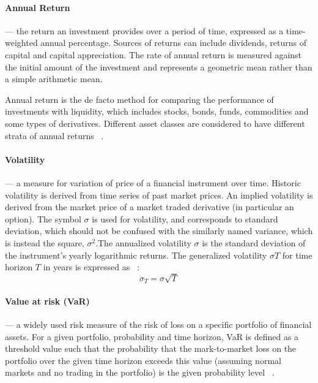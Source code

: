 \paragraph*{Annual Return} --- the return an investment provides over a period of time, expressed as a time-weighted annual percentage. Sources of returns can include dividends, returns of capital and capital appreciation. The rate of annual return is measured against the initial amount of the investment and represents a geometric mean rather than a simple arithmetic mean. 

    Annual return is the de facto method for comparing the performance of investments with liquidity, which includes stocks, bonds, funds, commodities and some types of derivatives. Different asset classes are considered to have different strata of annual returns ~\cite{Sel6}.

\paragraph*{Volatility} --- a measure for variation of price of a financial instrument over time. Historic volatility is derived from time series of past market prices. An implied volatility is derived from the market price of a market traded derivative (in particular an option). The symbol $\sigma$ is used for volatility, and corresponds to standard deviation, which should not be confused with the similarly named variance, which is instead the square, $\sigma^2$.The annualized volatility $\sigma$ is the standard deviation of the instrument's yearly logarithmic returns.
    The generalized volatility $\sigma T$ for time horizon $T$ in years is expressed as ~\cite{Sel8}:
\begin{equation}
\sigma_T = \sigma \sqrt{T}
\end{equation}
 
\paragraph*{Value at risk (VaR)} --- a widely used risk measure of the risk of loss on a specific portfolio of financial assets. For a given portfolio, probability and time horizon, VaR is defined as a threshold value such that the probability that the mark-to-market loss on the portfolio over the given time horizon exceeds this value (assuming normal markets and no trading in the portfolio) is the given probability level ~\cite{Sel9}.

